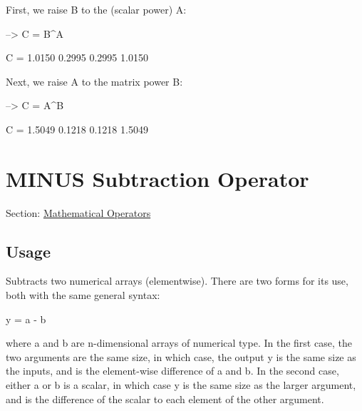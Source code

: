 First, we raise {\ttfamily B} to the (scalar power) {\ttfamily A}\-:


\begin{DoxyVerbInclude}
--> C = B^A

C = 
    1.0150    0.2995 
    0.2995    1.0150 
\end{DoxyVerbInclude}


Next, we raise {\ttfamily A} to the matrix power {\ttfamily B}\-:


\begin{DoxyVerbInclude}
--> C = A^B

C = 
    1.5049    0.1218 
    0.1218    1.5049 
\end{DoxyVerbInclude}
 \hypertarget{operators_minus}{}\section{M\-I\-N\-U\-S Subtraction Operator}\label{operators_minus}
Section\-: \hyperlink{sec_operators}{Mathematical Operators} \hypertarget{vtkwidgets_vtkxyplotwidget_Usage}{}\subsection{Usage}\label{vtkwidgets_vtkxyplotwidget_Usage}
Subtracts two numerical arrays (elementwise). There are two forms for its use, both with the same general syntax\-: \begin{DoxyVerb}  y = a - b
\end{DoxyVerb}
 where {\ttfamily a} and {\ttfamily b} are {\ttfamily n}-\/dimensional arrays of numerical type. In the first case, the two arguments are the same size, in which case, the output {\ttfamily y} is the same size as the inputs, and is the element-\/wise difference of {\ttfamily a} and {\ttfamily b}. In the second case, either {\ttfamily a} or {\ttfamily b} is a scalar, in which case {\ttfamily y} is the same size as the larger argument, and is the difference of the scalar to each element of the other argument.

